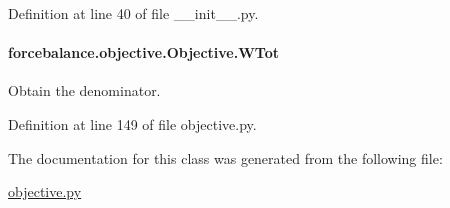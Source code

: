Definition at line 40 of file \-\_\-\-\_\-init\-\_\-\-\_\-.\-py.

\hypertarget{classforcebalance_1_1objective_1_1Objective_a1ea300bb1db142dfdf43621454e8c589}{
\paragraph[{W\-Tot}]{\setlength{\rightskip}{0pt plus 5cm}forcebalance.\-objective.\-Objective.\-W\-Tot}}\label{classforcebalance_1_1objective_1_1Objective_a1ea300bb1db142dfdf43621454e8c589}


Obtain the denominator. 



Definition at line 149 of file objective.\-py.



The documentation for this class was generated from the following file\-:\begin{DoxyCompactItemize}
\item 
\hyperlink{objective_8py}{objective.\-py}\end{DoxyCompactItemize}
